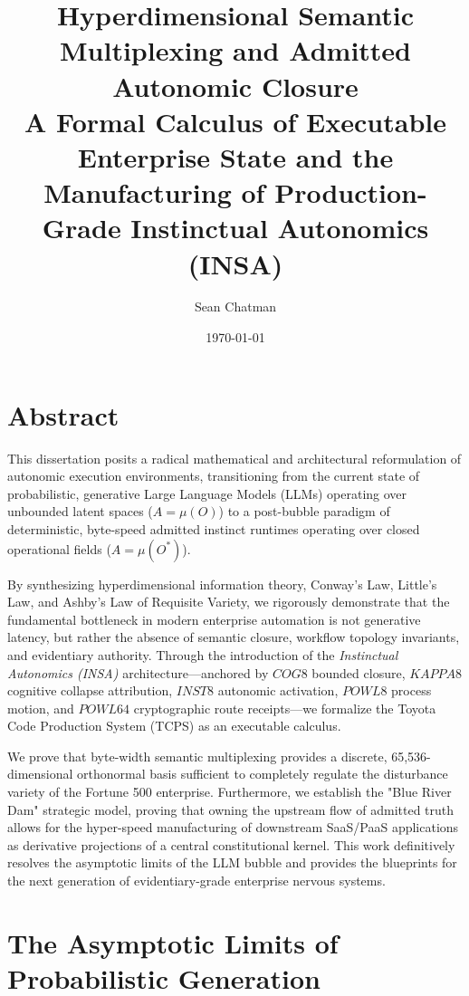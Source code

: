 \documentclass[12pt,a4paper,oneside]{book}
\title{\textbf{Hyperdimensional Semantic Multiplexing and Admitted Autonomic Closure}\\\vspace{1em}\Large A Formal Calculus of Executable Enterprise State and the Manufacturing of Production-Grade Instinctual Autonomics (INSA)}
\author{Sean Chatman}
\date{\today}
\begin{document}
\maketitle

\chapter*{Abstract}
This dissertation posits a radical mathematical and architectural reformulation of autonomic execution environments, transitioning from the current state of probabilistic, generative Large Language Models (LLMs) operating over unbounded latent spaces ($A = \mu(O)$) to a post-bubble paradigm of deterministic, byte-speed admitted instinct runtimes operating over closed operational fields ($A = \mu(O^*)$). 

By synthesizing hyperdimensional information theory, Conway's Law, Little's Law, and Ashby's Law of Requisite Variety, we rigorously demonstrate that the fundamental bottleneck in modern enterprise automation is not generative latency, but rather the absence of semantic closure, workflow topology invariants, and evidentiary authority. Through the introduction of the \textit{Instinctual Autonomics (INSA)} architecture---anchored by $COG8$ bounded closure, $KAPPA8$ cognitive collapse attribution, $INST8$ autonomic activation, $POWL8$ process motion, and $POWL64$ cryptographic route receipts---we formalize the Toyota Code Production System (TCPS) as an executable calculus. 

We prove that byte-width semantic multiplexing provides a discrete, 65,536-dimensional orthonormal basis sufficient to completely regulate the disturbance variety of the Fortune 500 enterprise. Furthermore, we establish the "Blue River Dam" strategic model, proving that owning the upstream flow of admitted truth allows for the hyper-speed manufacturing of downstream SaaS/PaaS applications as derivative projections of a central constitutional kernel. This work definitively resolves the asymptotic limits of the LLM bubble and provides the blueprints for the next generation of evidentiary-grade enterprise nervous systems.

\tableofcontents

\chapter{The Asymptotic Limits of Probabilistic Generation}
\end{document}
